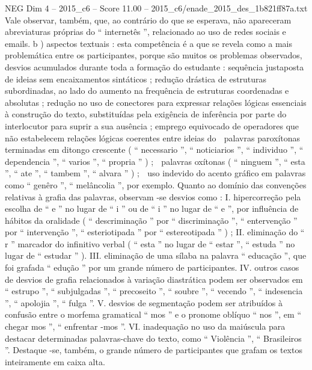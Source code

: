 \begin{textsample}{NEG Dim 4 – 2015\_c6 – Score 11.00 – 2015\_c6/enade\_2015\_des\_1b821ff87a.txt}
Vale observar, também, que, ao contrário do que se esperava, não apareceram abreviaturas próprias do “ internetês ”, relacionado ao uso de redes sociais e emails. b ) aspectos textuais : esta competência é a que se revela como a mais problemática entre os participantes, porque são muitos os problemas observados, desvios acumulados durante toda a formação do estudante : sequência justaposta de ideias sem encaixamentos sintáticos ; redução drástica de estruturas subordinadas, ao lado do aumento na frequência de estruturas coordenadas e absolutas ; redução no uso de conectores para expressar relações lógicas essenciais à construção do texto, substituídas pela exigência de inferência por parte do interlocutor para suprir a sua ausência ; emprego equivocado de operadores que não estabelecem relações lógicas coerentes entre ideias do  palavras paroxítonas terminadas em ditongo crescente ( “ necessario ”, “ noticiarios ”, “ individuo ”, “ dependencia ”, “ varios ”, “ propria ” ) ;  palavras oxítonas ( “ ninguem ”, “ esta ”, “ ate ”, “ tambem ”, “ alvara ” ) ;  uso indevido do acento gráfico em palavras como “ genêro ”, “ melâncolia ”, por exemplo.
Quanto ao domínio das convenções relativas à grafia das palavras, observam -se desvios como : I. hipercorreção pela escolha de “ e ” no lugar de “ i ” ou de “ i ” no lugar de “ e ”, por influência de hábitos da oralidade ( “ descriminação ” por “ discriminação ”, “ entervenção ” por “ intervenção ”, “ esteriotipada ” por “ estereotipada ” ) ; II. eliminação do “ r ” marcador do infinitivo verbal ( “ esta ” no lugar de “ estar ”, “ estuda ” no lugar de “ estudar ” ).
III. eliminação de uma sílaba na palavra “ educação ”, que foi grafada “ edução ” por um grande número de participantes.
IV. outros casos de desvios de grafia relacionados à variação diastrática podem ser observados em “ estrupo ”, “ subjulgadas ”, “ precoseito ”, “ soubre ”, “ vecendo ”, “ indesencia ”, “ apolojia ”, “ fulga ”.
V. desvios de segmentação podem ser atribuídos à confusão entre o morfema gramatical “ mos ” e o pronome oblíquo “ nos ”, em “ chegar mos ”, “ enfrentar -mos ”.
VI. inadequação no uso da maiúscula para destacar determinadas palavras-chave do texto, como “ Violência ”, “ Brasileiros ”.
Destaque -se, também, o grande número de participantes que grafam os textos inteiramente em caixa alta.

\end{textsample}
